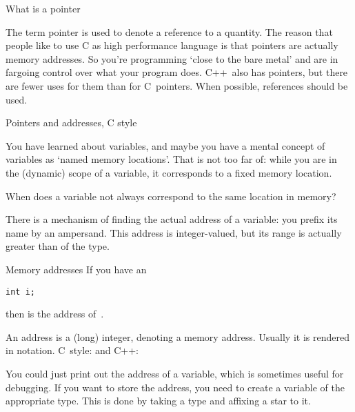 
 {What is a pointer}

The term pointer is used to denote a reference to a quantity. The
reason that people like to use C as high performance language is
that pointers are actually memory addresses. So you're programming
`close to the bare metal' and are in fargoing control over what your program
does. C++~also has pointers, but there are fewer uses for them than
for C~pointers. When possible, references should be used.

 {Pointers and addresses, C style}
\label{sec:cderef}

You have learned about variables, and maybe you have a mental concept
of variables as `named memory locations'. That is not too far of:
while you are in the (dynamic) scope of a variable, it corresponds to
a fixed memory location.

\begin{exercise}
  \label{ex:varmemscope}
  When does a variable not always correspond to the same location in
  memory?
\end{exercise}

There is a mechanism of finding the actual address of a variable: you
prefix its name by an ampersand. 
This address is integer-valued, but
its range is actually greater than of the  type.

\begin{block}{Memory addresses}
  \label{sl:ampersand}
  If you have an
\begin{lstlisting}
int i;
\end{lstlisting}
then  is the address of~.

An address is a (long) integer, denoting a memory address. Usually it
is rendered in  notation. C~style:
%
%
and C++:
%
\end{block}

You could just print out the address of a variable, which is sometimes
useful for debugging. If you want to store the address, you need to
create a variable of the appropriate type. This is done by taking a
type and affixing a star to it.

